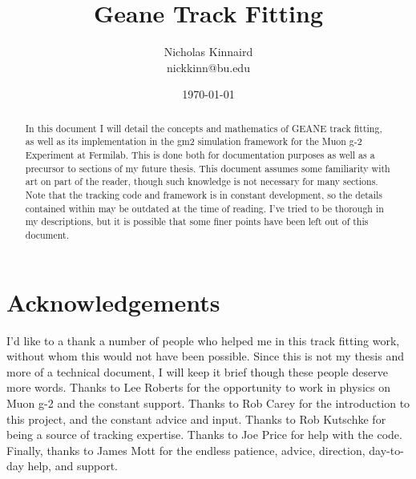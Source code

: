 \documentclass{article}
\begin{document}
\title{Geane Track Fitting}
\author{Nicholas Kinnaird \\ nickkinn@bu.edu}
\date{\today}
\maketitle

\begin{abstract}

    In this document I will detail the concepts and mathematics of GEANE track fitting, as well as its implementation in the gm2 simulation framework for the Muon g-2 Experiment at Fermilab. This is done both for documentation purposes as well as a precursor to sections of my future thesis. This document assumes some familiarity with art on part of the reader, though such knowledge is not necessary for many sections. Note that the tracking code and framework is in constant development, so the details contained within may be outdated at the time of reading. I've tried to be thorough in my descriptions, but it is possible that some finer points have been left out of this document.

\end{abstract}

\tableofcontents













% 







\clearpage
\printbibliography


\section*{Acknowledgements}

	I'd like to a thank a number of people who helped me in this track fitting work, without whom this would not have been possible. Since this is not my thesis and more of a technical document, I will keep it brief though these people deserve more words. Thanks to Lee Roberts for the opportunity to work in physics on Muon g-2 and the constant support. Thanks to Rob Carey for the introduction to this project, and the constant advice and input. Thanks to Rob Kutschke for being a source of tracking expertise. Thanks to Joe Price for help with the code. Finally, thanks to James Mott for the endless patience, advice, direction, day-to-day help, and support.
\end{document}
